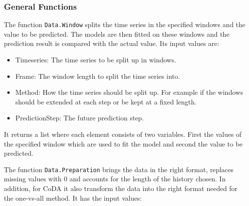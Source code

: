 \subsubsection{General Functions}
\label{sec: General Functions}

The function \texttt{Data.Window} splits the time series in the specified windows and the value to be predicted. The models are then fitted on these windows and the prediction result is compared with the actual value. Its input values are:

\begin{itemize}
	\item Timeseries: The time series to be split up in windows.
	\item Frame: The window length to split the time series into.
	\item Method: How the time series should be split up. For example if the windows should be extended at each step or be kept at a fixed length.
	\item PredictionStep: The future prediction step.
\end{itemize}

It returns a list where each element consists of two variables. First the values of the specified window which are used to fit the model and second the value to be predicted. 

The function \texttt{Data.Preparation} brings the data in the right format, replaces missing values with 0 and accounts for the length of the history chosen. In addition, for CoDA it also transform the data into the right format needed for the one-vs-all method. It has the input values:

